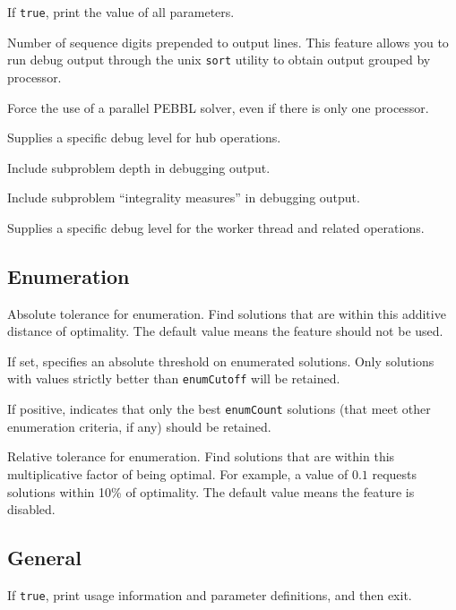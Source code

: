 If \texttt{true}, print the value of all parameters.

Number of sequence digits prepended to output lines.  This feature
allows you to run debug output through the unix \texttt{sort} utility
to obtain output grouped by processor.

 Force the use of a parallel PEBBL
solver, even if there is only one processor.  

Supplies a specific debug level for hub operations.

Include subproblem depth in debugging output.

Include subproblem ``integrality measures'' in debugging output.

Supplies a specific debug level for the worker thread and related operations.


\subsection{Enumeration}
\vspace{-3ex}
Absolute tolerance for enumeration.  Find solutions
that are within this additive distance of optimality.  The default
value means the feature should not be used.

If set, specifies an absolute threshold on enumerated solutions.  Only
solutions with values strictly better than \texttt{enumCutoff} will be
retained. 

        If positive, indicates that only the best \texttt{enumCount}
        solutions (that meet other enumeration criteria, if any)
        should be retained. 

        Relative tolerance for enumeration.  Find solutions
        that are within this multiplicative factor of being
        optimal.  For example, a value of $0.1$ requests solutions
        within 10\% of optimality.  The default value means the
        feature is disabled.


\subsection{General}
\vspace{-3ex}
If \texttt{true}, print usage information and parameter definitions, and then exit.

